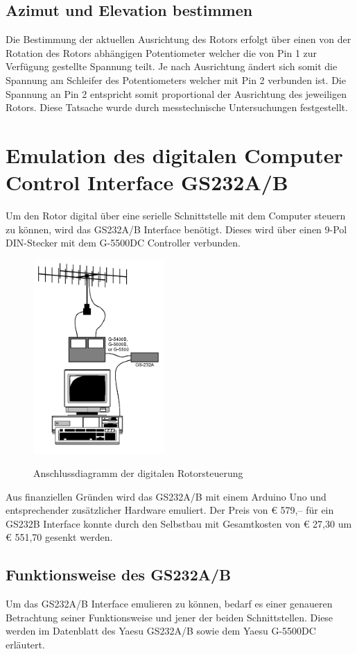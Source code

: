 \subsection {Azimut und Elevation bestimmen}
Die Bestimmung der aktuellen Ausrichtung des Rotors erfolgt über einen von der Rotation des Rotors abhängigen Potentiometer welcher die von Pin 1 zur Verfügung gestellte Spannung teilt. Je nach Ausrichtung ändert sich somit die Spannung am Schleifer des Potentiometers welcher mit Pin 2 verbunden ist. Die Spannung an Pin 2 entspricht somit proportional der Ausrichtung des jeweiligen Rotors. Diese Tatsache wurde durch messtechnische Untersuchungen festgestellt.

\section{Emulation des digitalen Computer Control Interface GS232A/B}
Um den Rotor digital über eine serielle Schnittstelle mit dem Computer steuern zu können, wird das GS232A/B Interface benötigt. Dieses wird über einen 9-Pol DIN-Stecker mit dem G-5500DC Controller verbunden. 
\begin{figure}[H]
	\cite{noauthor_yaesu_nodate}
	\centering
	\includegraphics[width=5cm]{../ref/GS232_Prinzipschaltbild.png}
	\label{fig:Rotor_Prinzipschaltbild}
	\caption{Anschlussdiagramm der digitalen Rotorsteuerung}
\end{figure}
Aus finanziellen Gründen wird das GS232A/B mit einem Arduino Uno und entsprechender zusätzlicher Hardware emuliert. Der Preis von € 579,-- für ein GS232B Interface \cite{noauthor_yaesuinterface_nodate} konnte durch den Selbstbau mit Gesamtkosten von € 27,30 um € 551,70 gesenkt werden.

\subsection{Funktionsweise des GS232A/B}
Um das GS232A/B Interface emulieren zu können, bedarf es einer genaueren Betrachtung seiner Funktionsweise und jener der beiden Schnittstellen. Diese werden im Datenblatt des Yaesu GS232A/B sowie dem Yaesu G-5500DC \cite{noauthor_yaesu_nodate} erläutert.

